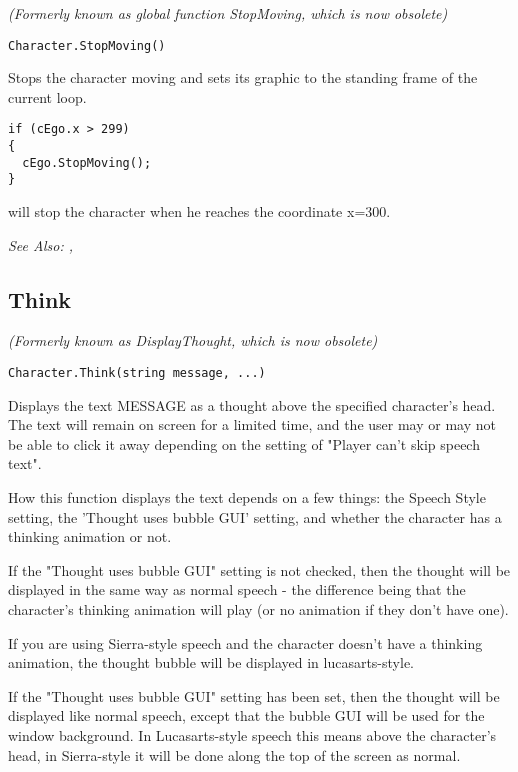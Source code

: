 \it{(Formerly known as global function StopMoving, which is now obsolete)}

\begin{verbatim}
Character.StopMoving()
\end{verbatim}
Stops the character moving and sets its graphic to the standing frame of the current loop.

\begin{verbatim}
if (cEgo.x > 299)
{
  cEgo.StopMoving();
}
\end{verbatim}
will stop the character when he reaches the coordinate x=300.

\it{See Also:} , 


\subsection{Think}\label{Character.Think}%

\it{(Formerly known as DisplayThought, which is now obsolete)}

\begin{verbatim}
Character.Think(string message, ...)
\end{verbatim}
Displays the text MESSAGE as a thought above the specified character's head.
The text will remain on screen for a limited time, and the user may or may
not be able to click it away depending on the setting of "Player can't
skip speech text".

How this function displays the text depends on a few things: the Speech Style
setting, the 'Thought uses bubble GUI' setting, and whether the character has a thinking
animation or not.

If the "Thought uses bubble GUI" setting is not checked, then the thought will be displayed
in the same way as normal speech - the difference being that the character's thinking animation
will play (or no animation if they don't have one).

If you are using Sierra-style speech and the character doesn't have a thinking animation,
the thought bubble will be displayed in lucasarts-style.

If the "Thought uses bubble GUI" setting has been set, then the thought will be displayed
like normal speech, except that the bubble GUI will be used for the window background.
In Lucasarts-style speech this means above the character's head, in Sierra-style it will
be done along the top of the screen as normal.

